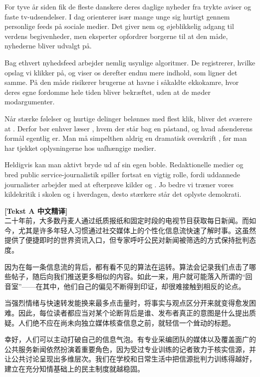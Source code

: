 For tyve år siden fik de fleste danskere deres daglige nyheder fra trykte aviser og faste tv-udsendelser. I dag orienterer især mange unge sig hurtigt gennem personlige feeds på sociale medier. Det giver nem og øjeblikkelig adgang til verdens begivenheder, men eksperter opfordrer borgerne til at  den måde, nyhederne bliver udvalgt på.

Bag ethvert nyhedsfeed arbejder nemlig usynlige algoritmer. De registrerer, hvilke opslag vi klikker på, og viser os derefter endnu mere indhold, som ligner det samme. På den måde risikerer brugerne at havne i såkaldte ekkokamre, hvor deres egne fordomme hele tiden bliver bekræftet, uden at de møder modargumenter.

Når stærke følelser og hurtige delinger belønnes med flest klik, bliver det sværere at . Derfor bør enhver læser , hvem der står bag en påstand, og hvad afsenderens formål egentlig er. Man må simpelthen aldrig  en dramatisk overskrift , før man har tjekket oplysningerne hos uafhængige medier.

Heldigvis kan man aktivt bryde ud af sin egen boble. Redaktionelle medier og bred public service-journalistik spiller fortsat en vigtig rolle, fordi uddannede journalister arbejder med at efterprøve kilder og . Jo bedre vi træner vores kildekritik i skolen og i hverdagen, desto stærkere står det oplyste demokrati.

\begin{transbox}
\small
\textbf{\color{NCDTeal}[Tekst A 中文精译]}\\
二十年前，大多数丹麦人通过纸质报纸和固定时段的电视节目获取每日新闻。而如今，尤其是许多年轻人习惯通过社交媒体上的个性化信息流快速了解时事。这虽然提供了便捷即时的世界资讯入口，但专家呼吁公民对新闻被筛选的方式保持批判态度。

因为在每一条信息流的背后，都有看不见的算法在运转。算法会记录我们点击了哪些帖子，随后向我们推送更多相似的内容。如此一来，用户就可能落入所谓的“回音室”——在其中，他们自己的偏见不断得到印证，却很难接触到相反的论点。

当强烈情绪与快速转发能换来最多点击量时，将事实与观点区分开来就变得愈发困难。因此，每位读者都应当对某个论断背后是谁、发布者真正的意图是什么提出质疑。人们绝不应在尚未向独立媒体核查信息之前，就轻信一个耸动的标题。

幸好，人们可以主动打破自己的信息气泡。有专业采编团队的媒体以及覆盖面广的公共服务新闻依然扮演着重要角色，因为受过专业训练的记者致力于核实信源，并让公共讨论呈现出多维层次。我们在学校和日常生活中把信源批判力训练得越好，建立在充分知情基础上的民主制度就越稳固。
\end{transbox}

